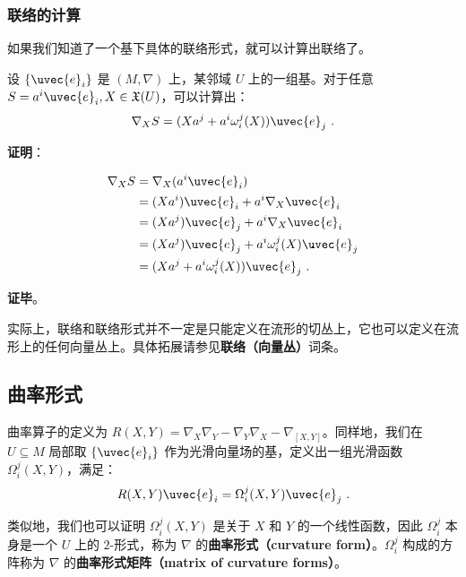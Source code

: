 \subsubsection{联络的计算}

如果我们知道了一个基下具体的联络形式，就可以计算出联络了。

\begin{theorem}{}
设 $\{\uvec{e}_i\}$ 是 $(M, \nabla)$ 上，某邻域 $U$ 上的一组基。对于任意 $S=a^i\uvec{e}_i, X\in\mathfrak{X}(U)$，可以计算出：
\begin{equation}
\nabla_XS=(Xa^j+a^i\omega^j_i(X))\uvec{e}_j~.
\end{equation}
\end{theorem}

\textbf{证明}：

\begin{equation}
\begin{aligned}
\nabla_XS&=\nabla_X(a^i\uvec{e}_i)\\
&=(Xa^i)\uvec{e}_i+a^i\nabla_X\uvec{e}_i\\
&=(Xa^j)\uvec{e}_j+a^i\nabla_X\uvec{e}_i\\
&=(Xa^j)\uvec{e}_j+a^i\omega^j_i(X)\uvec{e}_j\\
&=(Xa^j+a^i\omega^j_i(X))\uvec{e}_j~.
\end{aligned}
\end{equation}

\textbf{证毕}。

实际上，联络和联络形式并不一定是只能定义在流形的切丛上，它也可以定义在流形上的任何向量丛上。具体拓展请参见\textbf{联络（向量丛）}词条。

\subsection{曲率形式}

曲率算子的定义为 $R(X, Y)=\nabla_X\nabla_Y-\nabla_Y\nabla_X-\nabla_{[X, Y]}$。同样地，我们在 $U\subseteq M$ 局部取 $\{\uvec{e}_i\}$ 作为光滑向量场的基，定义出一组光滑函数 $\Omega^j_i(X, Y)$，满足：
\begin{equation}
R(X, Y)\uvec{e}_i=\Omega^j_i(X, Y)\uvec{e}_j~.
\end{equation}

类似地，我们也可以证明 $\Omega^j_i(X, Y)$ 是关于 $X$ 和 $Y$ 的一个线性函数，因此 $\Omega^j_i$ 本身是一个 $U$ 上的 $2$-形式，称为 $\nabla$ 的\textbf{曲率形式（curvature form）}。$\Omega^j_i$ 构成的方阵称为 $\nabla$ 的\textbf{曲率形式矩阵（matrix of curvature forms）}。

